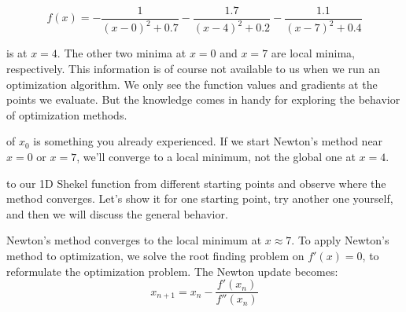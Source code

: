 

\begin{equation*}
    f(x) = -\frac{1}{(x-0)^2 + 0.7} - \frac{1.7}{(x-4)^2 + 0.2} - \frac{1.1}{(x-7)^2 + 0.4}
\end{equation*}

 is at $x = 4$. The other two minima at $x = 0$ and $x = 7$ are local minima, respectively. 
This information is of course not available to us when we run an optimization algorithm. We only see the function values and gradients at the points we evaluate. But the knowledge 
comes in handy for exploring the behavior of optimization methods.



 of $x_0$ is something you already experienced. 
If we start Newton's method near $x = 0$ or $x = 7$, we'll converge to a local minimum, not the global one at $x = 4$. 


 to our 1D Shekel function\cite{shekel1971test} from different starting points and observe where the method converges.
Let's show it for one starting point, try another one yourself, and then we will discuss the general behavior.

 Newton's method converges to the local minimum at $x \approx 7$. 
To apply Newton's method to optimization, we solve the root finding problem on $f'(x) = 0$, to reformulate the optimization problem.
The Newton update becomes:
\begin{equation}
    x_{n+1} = x_n - \frac{f'(x_n)}{f''(x_n)}
\end{equation}

